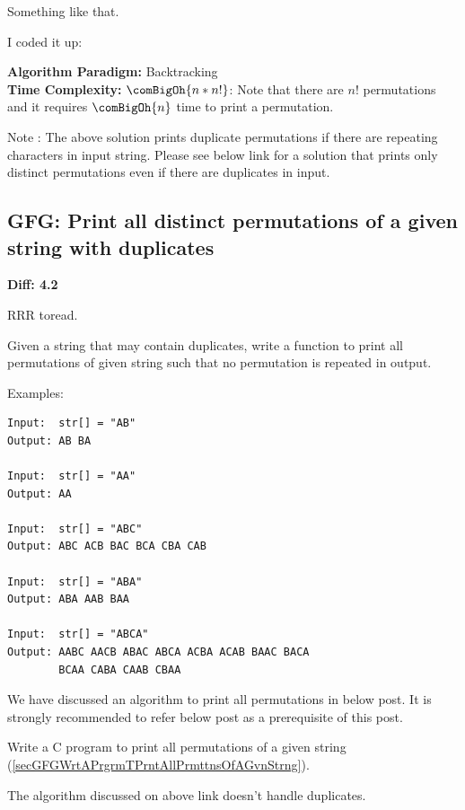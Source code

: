 Something like that.

I coded it up: 

\noindent{}\textbf{Algorithm Paradigm:} Backtracking\\

\noindent{}\textbf{Time Complexity:} $\comBigOh{n*n!}$: Note that there are
$n!$ permutations and it requires $\comBigOh{n}$ time to print a
permutation.

Note : The above solution prints duplicate permutations if there are
repeating characters in input string. Please see below link for a solution
that prints only distinct permutations even if there are duplicates in
input.

\subsection{GFG: Print all distinct permutations of a given string with duplicates
  \label{secGFGPrntAllDstnctPrmttnsOfAGvnStrngWthDuplcts}}

\noindent{}\textbf{Diff: 4.2}

RRR toread.

Given a string that may contain duplicates, write a function to print all
permutations of given string such that no permutation is repeated in output.

Examples:
\begin{lstlisting}[style=raygeneric]
Input:  str[] = "AB"
Output: AB BA

Input:  str[] = "AA"
Output: AA

Input:  str[] = "ABC"
Output: ABC ACB BAC BCA CBA CAB

Input:  str[] = "ABA"
Output: ABA AAB BAA

Input:  str[] = "ABCA"
Output: AABC AACB ABAC ABCA ACBA ACAB BAAC BACA 
        BCAA CABA CAAB CBAA
\end{lstlisting}
We have discussed an algorithm to print all permutations in below post. It
is strongly recommended to refer below post as a prerequisite of this post.

Write a C program to print all permutations of a given string
(\cref{secGFGWrtAPrgrmTPrntAllPrmttnsOfAGvnStrng}).

The algorithm discussed on above link doesn't handle duplicates.

